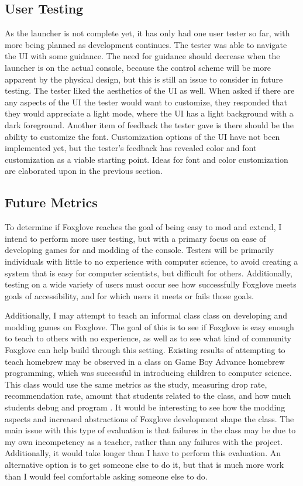 \documentclass[10pt,twocolumn]{article}
\begin{document}
\subsection{User Testing}

As the launcher is not complete yet, it has only had one user tester so far,
with more being planned as development continues. The tester was able to
navigate the UI with some guidance. The need for guidance should decrease when
the launcher is on the actual console, because the control scheme will be more
apparent by the physical design, but this is still an issue to consider in
future testing. The tester liked the aesthetics of the UI as well. When asked
if there are any aspects of the UI the tester would want to customize, they
responded that they would appreciate a light mode, where the UI has a light
background with a dark foreground. Another item of feedback the tester gave is
there should be the ability to customize the font. Customization options of the
UI have not been implemented yet, but the tester's feedback has revealed color
and font customization as a viable starting point. Ideas for font and color
customization are elaborated upon in the previous section.

\subsection{Future Metrics}

To determine if Foxglove reaches the goal of being easy to mod and
extend, I intend to perform more user testing, but with a primary focus on ease
of developing games for and modding of the console. Testers will be primarily
individuals with little to no experience with computer science, to avoid
creating a system that is easy for computer scientists,
but difficult for others. Additionally, testing on a wide variety of users must
occur see how successfully Foxglove meets goals of accessibility, and
for which users it meets or fails those goals.

Additionally, I may attempt to teach an informal class
class on developing and modding games on Foxglove. The goal of this is
to see if Foxglove is easy enough to teach to others with no
experience, as well as to see what kind of community Foxglove can help
build through this setting. Existing results of attempting to teach homebrew may
be observed in a class on Game Boy Advance homebrew programming, which was
successful in introducing children to computer science.
This class would use the same metrics
as the study, measuring drop rate, recommendation rate, amount that students
related to the class, and how much students debug and program
\cite{kacmarcik_introducing_2009}. It would be interesting to see how the
modding aspects and increased abstractions of Foxglove development shape the
class. The main issue with this type of evaluation is that
failures in the class may be due to my own incompetency as a teacher, rather
than any failures with the project. Additionally, it would take longer than I
have to perform this evaluation. An alternative option is to get someone else
to do it, but that is much more work than I would feel comfortable asking
someone else to do.
\end{document}
